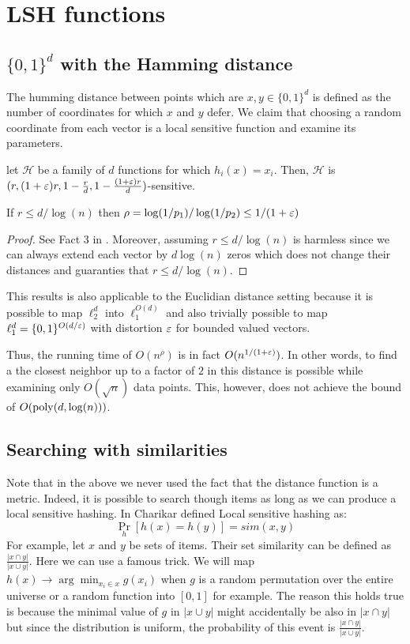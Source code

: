 \section{LSH functions}
\subsection{$\{0,1\}^d$  with the Hamming distance}
The humming distance between points which are $x,y\in \{0,1\}^d$ is defined as 
the number of coordinates for which $x$ and $y$ defer. We claim that choosing a random 
coordinate from each vector is a local sensitive function and examine its parameters.   
\begin{fact}
let $\mathcal{H}$ be a family of $d$ functions for which $h_i(x) = x_i$.
Then, $\mathcal{H}$ is $(r,(1+\varepsilon)r,1-\frac{r}{d},1-\frac{(1+\varepsilon)r}{d})$-sensitive.
\end{fact}
\begin{fact}
If $r \le d/\log(n)$ then $\rho = \log(1/p_1)/\log(1/p_2) \le 1/(1+\varepsilon)$
\end{fact}
\begin{proof}
See Fact 3 in \cite{GionisIM99}. Moreover, assuming $r \le d/\log(n)$ is harmless since we can always 
extend each vector by $d\log(n)$ zeros which does not change their distances and guaranties that  $r \le d/\log(n)$.
 \end{proof}


\begin{remark}
This results is also applicable to the Euclidian distance setting because it is possible
to map $\ell_{2}^{d}$ into $\ell_{1}^{O(d)}$ and also trivially possible to map $\ell_{1}^{d} = \{0,1\}^{O(d/\varepsilon)}$ with distortion 
$\varepsilon$ for bounded valued vectors. 
\end{remark}


Thus, the running time of $O(n^{\rho})$ is in fact $O(n^{1/(1+\varepsilon)})$. In other words, to find a
the closest neighbor up to a factor of $2$ in this distance is possible while examining only $O(\sqrt{n})$ data points.
This, however, does not achieve the bound of $O({\operatorname{poly}}(d,\log(n)))$.  

\subsection{Searching with similarities}
Note that in the above we never used the fact that the distance function is a metric. 
Indeed, it is possible to search though items as long as we can produce a local sensitive hashing.
In \cite{Charikar02} Charikar defined Local sensitive hashing as:
\[
\Pr_{h}[h(x)=h(y)] = sim(x,y)
\]
For example, let $x$ and $y$ be sets of items. Their set similarity can be defined as $\frac{| x \cap y|}{|x \cup y|}$.
Here we can use a famous trick. We will map $h(x) \rightarrow \arg \min_{x_i \in x} g(x_i)$ when $g$ is a random permutation over
the entire universe or a random function into $[0,1]$ for example. The reason this holds true is because 
the minimal value of $g$ in $|x \cup y|$ might accidentally be also in $| x \cap y|$ but 
since the distribution is uniform, the probability of this event is $\frac{| x \cap y|}{|x \cup y|}$.
 
